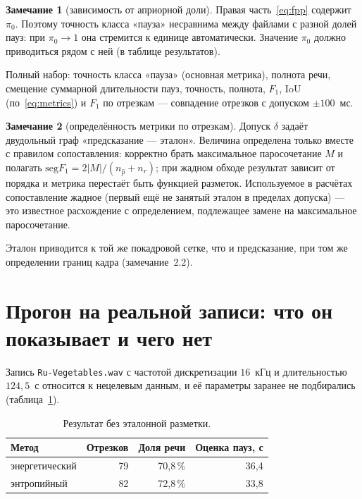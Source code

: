 \documentclass[11pt,a4paper]{article}
\theoremstyle{definition}
\newtheorem{zam}{Замечание}[section]
\theoremstyle{plain}
\newcommand{\code}[1]{\texttt{#1}}
\begin{document}
\begin{zam}[зависимость от априорной доли]
Правая часть~\eqref{eq:fpp} содержит $\pi_0$. Поэтому точность класса «пауза»
несравнима между файлами с разной долей пауз: при $\pi_0\to1$ она стремится к
единице автоматически. Значение $\pi_0$ должно приводиться рядом с ней
(в таблице результатов).
\end{zam}

Полный набор: точность класса «пауза» (основная метрика), полнота речи,
смещение суммарной длительности пауз, точность, полнота, $F_1$, $\mathrm{IoU}$
(по~\eqref{eq:metrics}) и $F_1$ по отрезкам --- совпадение отрезков с допуском
$\pm100$~мс.

\begin{zam}[определённость метрики по отрезкам]
Допуск $\delta$ задаёт двудольный граф «предсказание --- эталон». Величина
определена только вместе с правилом сопоставления: корректно брать
максимальное паросочетание $M$ и полагать
$\mathrm{seg}F_1=2|M|/(n_{\hat p}+n_r)$; при жадном обходе результат зависит
от порядка и метрика перестаёт быть функцией разметок. Используемое в расчётах
сопоставление жадное (первый ещё не занятый эталон в пределах допуска) ---
это известное расхождение с определением, подлежащее замене на максимальное
паросочетание.
\end{zam}

Эталон приводится к той же покадровой сетке, что и предсказание, при том же
определении границ кадра (замечание~2.2).

\section{Прогон на реальной записи: что он показывает и чего нет}

Запись \code{Ru-Vegetables.wav} с частотой дискретизации $16$~кГц и
длительностью $124{,}5$~с относится к нецелевым данным, и её параметры заранее
не подбирались (таблица~\ref{tab:realcheck}).

\begin{table}[h]\centering\small
\caption{Результат без эталонной разметки.}\label{tab:realcheck}
\begin{tabular}{@{}lrrr@{}}
\toprule
Метод & Отрезков & Доля речи & Оценка пауз, с \\
\midrule
энергетический & 79 & 70{,}8\,\% & 36{,}4 \\
энтропийный    & 82 & 72{,}8\,\% & 33{,}8 \\
\bottomrule
\end{tabular}
\end{table}
\end{document}
